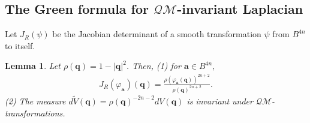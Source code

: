 \documentclass[a4paper,11pt]{amsart}
\numberwithin{equation}{section}
\newtheorem{lem}{Lemma}[section]
\begin{document}
\subsection{The Green formula for $\mathcal{QM}$-invariant Laplacian}
Let $J_R(\psi)$ be the Jacobian determinant of a smooth transformation $\psi$ from $B^{4n}$ to itself.
\begin{lem}\label{invariant measure}
Let $\rho(\mathbf{q})=1-|\mathbf{q}|^2$. Then, (1) for $\mathbf{a}\in B^{4n},$
\begin{equation}\begin{aligned}\label{jacobian}
J_R(\varphi_{\mathbf{a}})(\mathbf{q})=\frac{\rho(\varphi_{\mathbf{a}}(\mathbf{q}))^{2n+2}}{\rho(\mathbf{q})^{2n+2}}.
\end{aligned}\end{equation}
(2) The measure $d\widetilde{V}(\mathbf{q})=\rho(\mathbf{q})^{-2n-2}dV(\mathbf{q})$ is invariant under $\mathcal{QM}$-transformations.
\end{lem}
\end{document}
